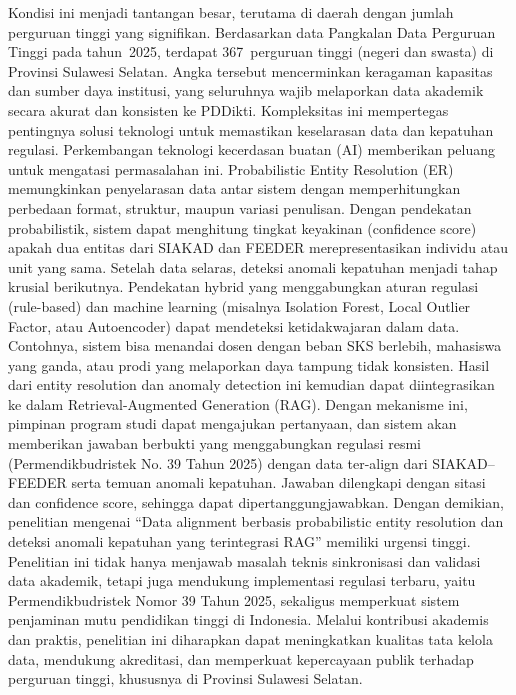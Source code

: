\documentclass[12pt,a4paper,oneside]{report}
\begin{document}
            Kondisi ini menjadi tantangan besar, terutama di daerah dengan jumlah perguruan tinggi yang signifikan. Berdasarkan data Pangkalan Data Perguruan Tinggi pada tahun~2025,
            terdapat 367~perguruan tinggi (negeri dan swasta) di Provinsi Sulawesi Selatan. Angka tersebut mencerminkan keragaman kapasitas dan sumber daya institusi,
            yang seluruhnya wajib melaporkan data akademik secara akurat dan konsisten ke PDDikti.
            Kompleksitas ini mempertegas pentingnya solusi teknologi untuk memastikan keselarasan data dan kepatuhan regulasi.
            Perkembangan teknologi kecerdasan buatan (AI) memberikan peluang untuk mengatasi permasalahan ini.
            Probabilistic Entity Resolution (ER) memungkinkan penyelarasan data antar sistem dengan memperhitungkan perbedaan format, struktur, maupun variasi penulisan.
            Dengan pendekatan probabilistik, sistem dapat menghitung tingkat keyakinan (confidence score) apakah dua entitas dari SIAKAD dan FEEDER merepresentasikan individu atau unit yang sama.
            Setelah data selaras, deteksi anomali kepatuhan menjadi tahap krusial berikutnya. Pendekatan hybrid yang menggabungkan aturan regulasi (rule-based) dan machine learning (misalnya Isolation Forest, Local Outlier Factor, atau Autoencoder) dapat mendeteksi ketidakwajaran dalam data.
            Contohnya, sistem bisa menandai dosen dengan beban SKS berlebih, mahasiswa yang ganda, atau prodi yang melaporkan daya tampung tidak konsisten.
            Hasil dari entity resolution dan anomaly detection ini kemudian dapat diintegrasikan ke dalam Retrieval-Augmented Generation (RAG). Dengan mekanisme ini,
            pimpinan program studi dapat mengajukan pertanyaan, dan sistem akan memberikan jawaban berbukti yang menggabungkan regulasi resmi (Permendikbudristek No. 39 Tahun 2025) dengan data ter-align dari SIAKAD–FEEDER serta temuan anomali kepatuhan.
            Jawaban dilengkapi dengan sitasi dan confidence score, sehingga dapat dipertanggungjawabkan.
            Dengan demikian, penelitian mengenai “Data alignment berbasis probabilistic entity resolution dan deteksi anomali kepatuhan yang terintegrasi RAG” memiliki urgensi tinggi.
            Penelitian ini tidak hanya menjawab masalah teknis sinkronisasi dan validasi data akademik, tetapi juga mendukung implementasi regulasi terbaru, yaitu Permendikbudristek Nomor 39 Tahun 2025, sekaligus memperkuat sistem penjaminan mutu pendidikan tinggi di Indonesia.
            Melalui kontribusi akademis dan praktis, penelitian ini diharapkan dapat meningkatkan kualitas tata kelola data, mendukung akreditasi, dan memperkuat kepercayaan publik terhadap perguruan tinggi, khususnya di Provinsi Sulawesi Selatan.
\end{document}
